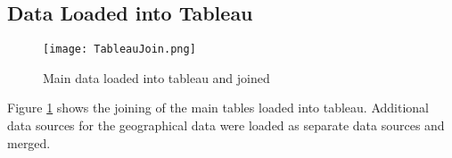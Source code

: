 \documentclass{article}
\begin{document}
\subsection{Data Loaded into Tableau }

\begin{figure}[H]
\begin{center}
  \texttt{[image: TableauJoin.png]}
  \caption{Main data loaded into tableau and joined}
  \label{fig:TableauJoin}
\end{center}
\end{figure}
Figure \ref{fig:TableauJoin} shows the joining of the main tables loaded into tableau. Additional data sources for the geographical data were loaded as separate data sources and merged.
\end{document}
